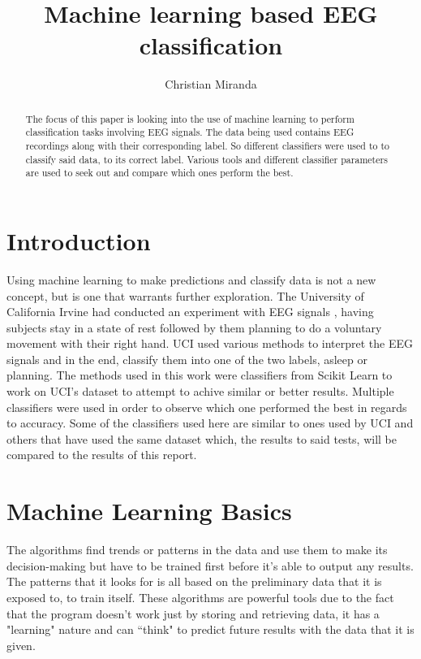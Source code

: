 \documentclass[conference,compsoc]{IEEEtran}
\begin{document}
\author{Christian Miranda}
\title{Machine learning based EEG classification}
\maketitle

\begin{abstract}
The focus of this paper is looking into the use of machine learning to perform classification tasks involving EEG signals.
The data being used contains EEG recordings along with their corresponding label. So different classifiers were used to 
to classify said data, to its correct label. Various tools and different classifier parameters are used to seek 
out and compare which ones perform the best. 
\end{abstract}

\section{Introduction}
Using machine learning to make predictions and classify data is not a new concept, but is one that warrants further exploration. 
The University of California Irvine had conducted an experiment with EEG signals \cite{classsvm}, having subjects stay in a state of rest followed by them planning to do a voluntary movement with their right hand. 
UCI used various methods to interpret the EEG signals and in the end, classify them into one of the two labels, asleep or planning. The methods used in this work were classifiers from Scikit Learn to work on UCI's dataset to attempt to achive similar or better results. Multiple classifiers were used in order to observe which one performed the best in regards 
to accuracy. Some of the classifiers used here are similar to ones used by UCI and others that have used the same dataset \cite{fuzzy} which, the results to said tests, will be compared to the results of this report.

\section{Machine Learning Basics}
The algorithms find trends or patterns in the data and use them to make its decision-making but have to be trained first before it's able to output any results.  The patterns that it looks for is all based on the preliminary data that it is exposed to, to train itself. These algorithms are powerful tools due to the fact that the program doesn't work just by storing and retrieving data, it has a "learning" nature and can ``think" to predict future results with the data that it is given.
\end{document}
